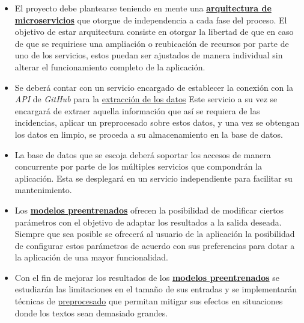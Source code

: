 \begin{itemize} [\textbullet]

\item El proyecto debe plantearse teniendo en mente una \hyperref[sec:microservicios]{\textbf{arquitectura de microservicios}} que otorgue de independencia a cada fase del proceso. El objetivo de estar arquitectura consiste en otorgar la libertad de que en caso de que se requiriese una ampliación o reubicación de recursos por parte de uno de los servicios, estos puedan ser ajustados de manera individual sin alterar el funcionamiento completo de la aplicación. 

\item Se deberá contar con un servicio encargado de establecer la conexión con la \emph{API} de \emph{GitHub} \cite{platform:github_api} para la \hyperref[sec:extraccion]{extracción de los datos} Este servicio a su vez se encargará de extraer aquella información que así se requiera de las incidencias, aplicar un preprocesado sobre estos datos, y una vez se obtengan los datos en limpio, se proceda a su almacenamiento en la base de datos.

\item La base de datos que se escoja deberá soportar los accesos de manera concurrente por parte de los múltiples servicios que compondrán la aplicación. Esta se desplegará en un servicio independiente para facilitar su mantenimiento.

\item Los \hyperref[sec:preentrenados]{\textbf{modelos preentrenados}} ofrecen la posibilidad de modificar ciertos parámetros con el objetivo de adaptar los resultados a la salida deseada. Siempre que sea posible se ofrecerá al usuario de la aplicación la posibilidad de configurar estos parámetros de acuerdo con sus preferencias para dotar a la aplicación de una mayor funcionalidad.

\item Con el fin de mejorar los resultados de los \hyperref[sec:preentrenados]{\textbf{modelos preentrenados}} se estudiarán las limitaciones en el tamaño de sus entradas y se implementarán técnicas de \hyperref[sec:preprocesamiento]{preprocesado} que permitan mitigar sus efectos en situaciones donde los textos sean demasiado grandes.

\end{itemize}
